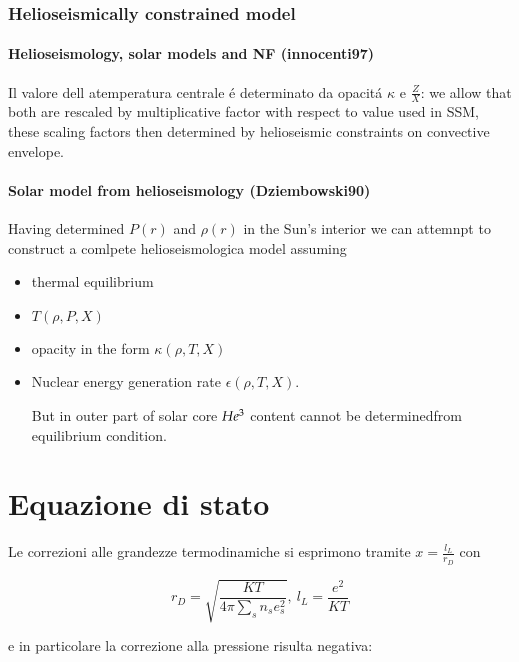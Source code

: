 \documentclass[../main.tex]{subfiles}
\begin{document}
\clearpage

\subsection{Helioseismically constrained model}

\subsubsection{Helioseismology, solar models and NF (innocenti97)}

Il valore dell atemperatura centrale \'e determinato da opacit\'a $\kappa$ e $\frac{Z}{X}$: we allow that both are rescaled by multiplicative factor with respect to value used in SSM, these scaling factors then determined by helioseismic constraints on convective envelope.

\subsubsection{Solar model from helioseismology (Dziembowski90)}

Having determined $P(r)$ and $\rho(r)$ in the Sun's interior we can attemnpt to construct a comlpete helioseismologica model assuming

\begin{itemize}
    \item thermal equilibrium
    \item $T(\rho,P,X)$
    \item opacity in the form $\kappa(\rho,T,X)$
    \item Nuclear energy generation rate $\epsilon(\rho,T,X)$.
    
    But in outer part of solar core $He\indices{^3}$ content cannot be determinedfrom equilibrium condition.
\end{itemize}

\chapter{Equazione di stato}
\PartialToc

Le correzioni alle grandezze termodinamiche si esprimono tramite $x=\frac{l_L}{r_D}$ con

\begin{equation*}
r_D=\sqrt{\frac{KT}{4\pi\sum_sn_se_s^2}},\ l_L=\frac{e^2}{KT}
\end{equation*}

e in particolare la correzione alla pressione risulta negativa:
\end{document}

